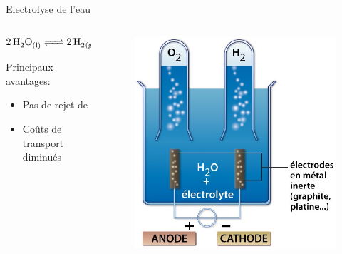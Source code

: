 \documentclass{beamer}
\begin{document}
\begin{frame}{Electrolyse de l'eau}
\begin{columns}
\begin{column}{0.40\textwidth}
$$ \ce{2H2O_{(l)} <=> 2H2_{(g)} + O2_{(g)}}$$
 
Principaux avantages:
\begin{itemize}
\item Pas de rejet de 
\item Coûts de transport diminués
\end{itemize}
\end{column}
\begin{column}{0.40\textwidth}
\begin{figure}
\includegraphics[scale=0.25]{schema/electrolyse}
\end{figure}
\end{column}
\end{columns}
\end{frame}
\end{document}
